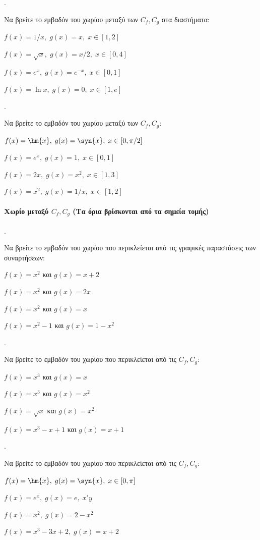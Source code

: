 \documentclass[11pt,a4paper,twocolumn]{article}
\newcounter{askhsh}
\newcommand{\askhsh}{\large\theaskhsh.\ \addtocounter{askhsh}{1}}
\begin{document}
\askhsh Να βρείτε το εμβαδόν του χωρίου μεταξύ των $C_f, C_g$ στα διαστήματα:
\begin{alist}
\item $f(x)=1/x, \; g(x)=x, \; x \in [1, 2]$
\item $f(x)=\sqrt{x}, \; g(x)=x/2, \; x \in [0, 4]$
\item $f(x)=e^x, \; g(x)=e^{-x}, \; x \in [0, 1]$
\item $f(x)=\ln{x}, \; g(x)=0, \; x \in [1, e]$
\end{alist}

\askhsh Να βρείτε το εμβαδόν του χωρίου μεταξύ των $C_f, C_g$:
\begin{alist}
\item $f(x)=\hm{x}, \; g(x)=\syn{x}, \; x \in [0, \pi/2]$
\item $f(x)=e^x, \; g(x)=1, \; x \in [0, 1]$
\item $f(x)=2x, \; g(x)=x^2, \; x \in [1, 3]$
\item $f(x)=x^2, \; g(x)=1/x, \; x \in [1, 2]$
\end{alist}
\paragraph{Χωρίο μεταξύ $C_f,C_g$ (Τα όρια βρίσκονται από τα σημεία τομής)}
\askhsh Να βρείτε το εμβαδόν του χωρίου που περικλείεται από τις γραφικές παραστάσεις των συναρτήσεων:
\begin{alist}
\item $f(x)=x^2$ και $g(x)=x+2$
\item $f(x)=x^2$ και $g(x)=2x$
\item $f(x)=x^2$ και $g(x)=x$
\item $f(x)=x^2-1$ και $g(x)=1-x^2$
\end{alist}

\askhsh Να βρείτε το εμβαδόν του χωρίου που περικλείεται από τις $C_f, C_g$:
\begin{alist}
\item $f(x)=x^3$ και $g(x)=x$
\item $f(x)=x^3$ και $g(x)=x^2$
\item $f(x)=\sqrt{x}$ και $g(x)=x^2$
\item $f(x)=x^3-x+1$ και $g(x)=x+1$
\end{alist}

\askhsh Να βρείτε το εμβαδόν του χωρίου που περικλείεται από τις $C_f, C_g$:
\begin{alist}
\item $f(x)=\hm{x}, \; g(x)=\syn{x}, \; x \in [0, \pi]$
\item $f(x)=e^x, \; g(x)=e, \; x'y$
\item $f(x)=x^2, \; g(x)=2-x^2$
\item $f(x)=x^3-3x+2, \; g(x)=x+2$
\end{alist}
\end{document}

